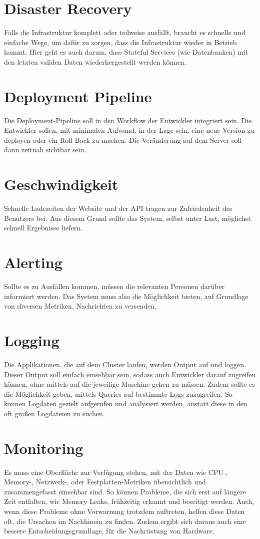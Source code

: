 \section{Disaster Recovery}
Falls die Infrastruktur komplett oder teilweise ausfällt,
braucht es schnelle und einfache Wege, um dafür zu sorgen, dass die Infrastruktur
wieder in Betrieb kommt. Hier geht es auch darum, dass Stateful Services (wie Datenbanken)
mit den letzten validen Daten wiederhergestellt werden können.

\section{Deployment Pipeline}
Die Deployment-Pipeline soll in den Workflow der Entwickler integriert sein.
Die Entwickler sollen, mit minimalen Aufwand, in der
Lage sein, eine neue Version zu deployen oder ein Roll-Back zu machen.
Die Veränderung auf dem Server soll dann zeitnah sichtbar sein.

\section{Geschwindigkeit}
Schnelle Ladezeiten der Website und der API tragen zur Zufriedenheit des
Benutzers bei.
Aus diesem Grund sollte das System, selbst unter Last, möglichst schnell Ergebnisse
liefern.

\section{Alerting}
Sollte es zu Ausfällen kommen, müssen die relevanten Personen darüber
informiert werden.
Das System muss also die Möglichkeit bieten, auf Grundlage von diversen Metriken,
Nachrichten zu versenden.

\section{Logging}
Die Applikationen, die auf dem Cluster laufen, werden Output auf 
und  loggen.
Dieser Output soll einfach einsehbar sein, sodass auch Entwickler darauf
zugreifen können, ohne mittels  auf die jeweilige Maschine gehen zu
müssen.
Zudem sollte es die Möglichkeit geben, mittels Queries auf bestimmte Logs
zuzugreifen.
So können Logdaten gezielt aufgerufen und analysiert werden, anstatt diese
in den oft großen Logdateien zu suchen.

\section{Monitoring}
Es muss eine Oberfläche zur Verfügung stehen, mit der Daten wie CPU-, Memory-, Netzwerk-, oder Festplatten-Metriken
übersichtlich und zusammengefasst einsehbar sind. So können Probleme, die sich
erst auf längere Zeit entfalten,
wie Memory Leaks, frühzeitig erkannt und beseitigt werden. Auch, wenn diese
Probleme ohne Vorwarnung trotzdem auftreten, helfen diese Daten oft,
die Ursachen im
Nachhinein zu finden.
Zudem ergibt sich daraus auch eine bessere Entscheidungsgrundlage,
für die Nachrüstung von Hardware.

